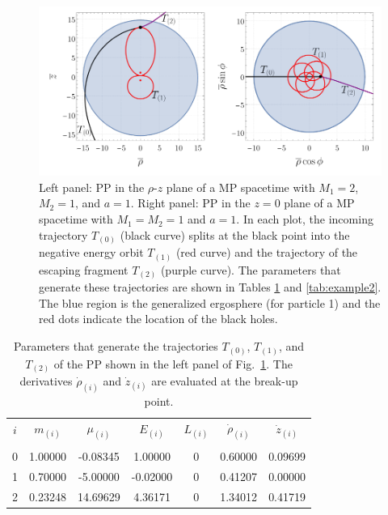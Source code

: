 \begin{figure}[!ht]
  \centering
  \includegraphics[width=\linewidth]{img/penrose_binaries/fig6.pdf}
  \caption{Left panel: PP in the $\rho$-$z$ plane of a MP spacetime with $M_1=2$, $M_2=1$, and $a=1$. Right panel: PP in the $z=0$ plane of a MP spacetime with $M_1=M_2=1$ and $a=1$. In each plot, the incoming trajectory $T_{(0)}$ (black curve) splits at the black point into the negative energy orbit $T_{(1)}$ (red curve) and the trajectory of the escaping fragment $T_{(2)}$ (purple curve). The parameters that generate these trajectories are shown in Tables \ref{tab:example1} and \ref{tab:example2}. The blue region is the generalized ergosphere (for particle 1) and the red dots indicate the location of the black holes.}
  \label{fig:example1}
\end{figure}

\begin{table}[h]
  \centering
  \begin{tabular}{ccccccc}
    \hline\hline
    $i$ & $m_{(i)}$ & $\mu_{(i)}$ & $E_{(i)}$ & $L_{(i)}$ & $\dot{\rho}_{(i)}$ & $\dot{z}_{(i)}$ \\ \vspace{-0.3cm} \\
    0   & 1.00000   & -0.08345    & 1.00000   & 0         & 0.60000            & 0.09699         \\
    1   & 0.70000   & -5.00000    & -0.02000  & 0         & 0.41207            & 0.00000         \\
    2   & 0.23248   & 14.69629    & 4.36171   & 0         & 1.34012            & 0.41719         \\
    \hline\hline
  \end{tabular}
  \caption{Parameters that generate the trajectories $T_{(0)}$, $T_{(1)}$, and $T_{(2)}$ of the PP shown in the left panel of Fig.~\ref{fig:example1}. The derivatives $\dot{\rho}_{(i)}$ and $\dot{z}_{(i)}$ are evaluated at the break-up point.}
  \label{tab:example1}
\end{table}

